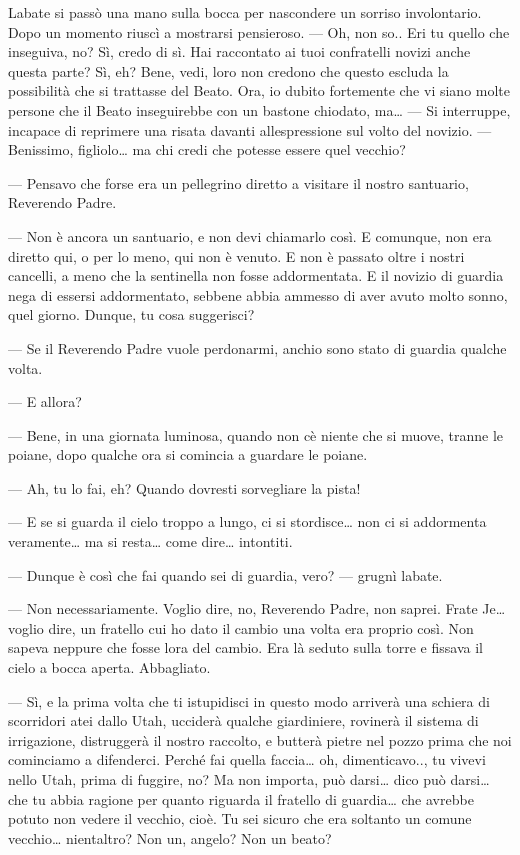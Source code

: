 L\textquotesingle abate si passò una mano sulla bocca per nascondere un
sorriso involontario. Dopo un momento riuscì a mostrarsi pensieroso. ---
Oh, non so.. Eri tu quello che inseguiva, no? Sì, credo di sì. Hai
raccontato ai tuoi confratelli novizi anche questa parte? Sì, eh? Bene,
vedi, loro non credono che questo escluda la possibilità che si
trattasse del Beato. Ora, io dubito fortemente che vi siano molte
persone che il Beato inseguirebbe con un bastone chiodato, ma\ldots{}
--- Si interruppe, incapace di reprimere una risata davanti
all\textquotesingle espressione sul volto del novizio. --- Benissimo,
figliolo\ldots{} ma chi credi che potesse essere quel vecchio?

--- Pensavo che forse era un pellegrino diretto a visitare il nostro
santuario, Reverendo Padre.

--- Non è ancora un santuario, e non devi chiamarlo così. E comunque,
non era diretto qui, o per lo meno, qui non è venuto. E non è passato
oltre i nostri cancelli, a meno che la sentinella non fosse
addormentata. E il novizio di guardia nega di essersi addormentato,
sebbene abbia ammesso di aver avuto molto sonno, quel giorno. Dunque, tu
cosa suggerisci?

--- Se il Reverendo Padre vuole perdonarmi, anch\textquotesingle io sono
stato di guardia qualche volta.

--- E allora?

--- Bene, in una giornata luminosa, quando non c\textquotesingle è
niente che si muove, tranne le poiane, dopo qualche ora si comincia a
guardare le poiane.

--- Ah, tu lo fai, eh? Quando dovresti sorvegliare la pista!

--- E se si guarda il cielo troppo a lungo, ci si stordisce\ldots{} non
ci si addormenta veramente\ldots{} ma si resta\ldots{} come dire\ldots{}
intontiti.

--- Dunque è così che fai quando sei di guardia, vero? --- grugnì
l\textquotesingle abate.

--- Non necessariamente. Voglio dire, no, Reverendo Padre, non saprei.
Frate Je\ldots{} voglio dire, un fratello cui ho dato il cambio una
volta era proprio così. Non sapeva neppure che fosse
l\textquotesingle ora del cambio. Era là seduto sulla torre e fissava il
cielo a bocca aperta. Abbagliato.

--- Sì, e la prima volta che ti istupidisci in questo modo arriverà una
schiera di scorridori atei dallo Utah, ucciderà qualche giardiniere,
rovinerà il sistema di irrigazione, distruggerà il nostro raccolto, e
butterà pietre nel pozzo prima che noi cominciamo a difenderci. Perché
fai quella faccia\ldots{} oh, dimenticavo.., tu vivevi nello Utah, prima
di fuggire, no? Ma non importa, può darsi\ldots{} dico può darsi\ldots{}
che tu abbia ragione per quanto riguarda il fratello di guardia\ldots{}
che avrebbe potuto non vedere il vecchio, cioè. Tu sei sicuro che era
soltanto un comune vecchio\ldots{} nient\textquotesingle altro? Non un,
angelo? Non un beato?

